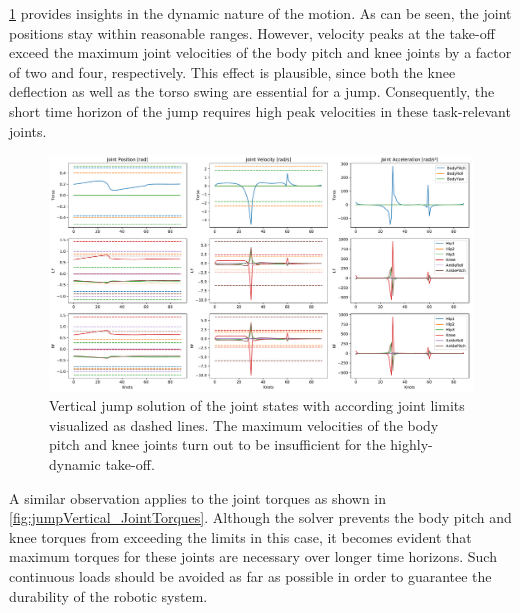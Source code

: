 \cref{fig:jumpVertical_JointState} provides insights in the dynamic nature of the motion. As can be seen, the joint positions stay within reasonable ranges. However, velocity peaks at the take-off exceed the maximum joint velocities of the body pitch and knee joints by a factor of two and four, respectively. This effect is plausible, since both the knee deflection as well as the torso swing are essential for a jump. Consequently, the short time horizon of the jump requires high peak velocities in these task-relevant joints. 

\begin{figure}[h!]
\centering	
\includegraphics[width=1\textwidth]{fig/jumpVertical/JointState}
\caption[Vertical jump solution according joint limits]{Vertical jump solution of the joint states with according joint limits visualized as dashed lines. The maximum velocities of the body pitch and knee joints turn out to be insufficient for the highly-dynamic take-off.}
\label{fig:jumpVertical_JointState}
\end{figure} 

A similar observation applies to the joint torques as shown in \cref{fig:jumpVertical_JointTorques}. Although the solver prevents the body pitch and knee torques from exceeding the limits in this case, it becomes evident that maximum torques for these joints are necessary over longer time horizons. Such continuous loads should be avoided as far as possible in order to guarantee the durability of the robotic system.

